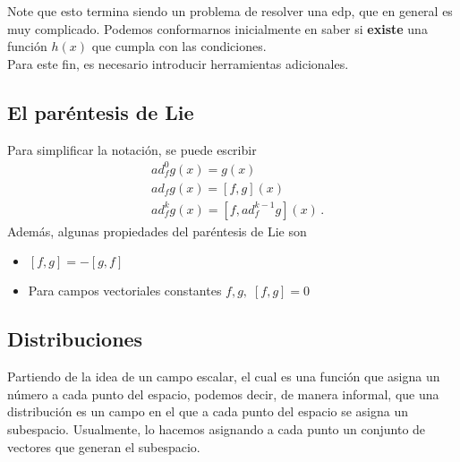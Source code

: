 Note que esto termina siendo un problema de resolver una \gls{edp}, que en general es muy complicado. Podemos conformarnos inicialmente en saber si \textbf{existe} una función $h(x)$ que cumpla con las condiciones.\\

Para este fin, es necesario introducir herramientas adicionales.\\

\subsection{El paréntesis de Lie}
Para simplificar la notación, se puede escribir
\begin{equation}
	\begin{aligned}
		 & ad_f^0 g(x) = g(x)                      \\
		 & ad_f g(x) = [f, g](x)                   \\
		 & ad_f^k g(x) = [f, ad_f^{k-1} g](x) \, .
	\end{aligned}
	\label{eq:lie_bracket_simplified}
\end{equation}
Además, algunas propiedades del paréntesis de Lie son
\begin{itemize}
	\item $ [f, g] = -[g, f] $
	\item  Para campos vectoriales constantes $ f, g, \; [f, g] = 0$
\end{itemize}

\subsection{Distribuciones}
Partiendo de la idea de un campo escalar, el cual es una función que asigna un número a cada punto del espacio, podemos decir, de manera informal, que una distribución es un campo en el que a cada punto del espacio se asigna un subespacio. Usualmente, lo hacemos asignando a cada punto un conjunto de vectores que generan el subespacio.

